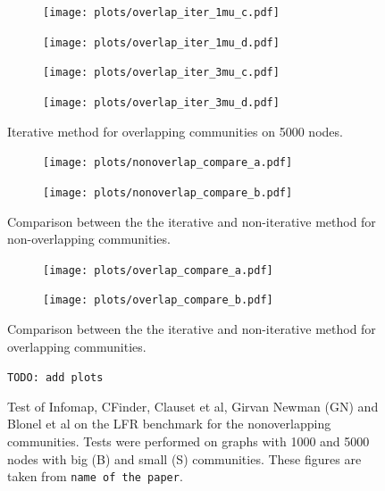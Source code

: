 \begin{figure}
    \centering
    \begin{subfigure}{0.5\textwidth}
    \centering
    \texttt{[image: plots/overlap\_iter\_1mu\_c.pdf]}
    \end{subfigure}%
    \begin{subfigure}{0.5\textwidth}
    \centering
    \texttt{[image: plots/overlap\_iter\_1mu\_d.pdf]}
    \end{subfigure}
    \begin{subfigure}{0.5\textwidth}
    \centering
    \texttt{[image: plots/overlap\_iter\_3mu\_c.pdf]}
    \end{subfigure}%
    \begin{subfigure}{0.5\textwidth}
    \centering
    \texttt{[image: plots/overlap\_iter\_3mu\_d.pdf]}
    \end{subfigure}
    \caption{Iterative method for overlapping communities on 5000 nodes.}\label{fig:iter_overlap_5000N}
\end{figure}

\begin{figure}
    \centering
    \begin{subfigure}{0.5\textwidth}
    \centering
    \texttt{[image: plots/nonoverlap\_compare\_a.pdf]}
    \end{subfigure}%
    \begin{subfigure}{0.5\textwidth}
    \centering
    \texttt{[image: plots/nonoverlap\_compare\_b.pdf]}
    \end{subfigure}
    \caption{Comparison between the the iterative and non-iterative method for non-overlapping communities.}\label{fig:compare_iter_no_overlap}
\end{figure}


\begin{figure}
    \centering
    \begin{subfigure}{0.5\textwidth}
    \centering
    \texttt{[image: plots/overlap\_compare\_a.pdf]}
    \end{subfigure}%
    \begin{subfigure}{0.5\textwidth}
    \centering
    \texttt{[image: plots/overlap\_compare\_b.pdf]}
    \end{subfigure}
    \caption{Comparison between the the iterative and non-iterative method for overlapping communities.}\label{fig:compare_iter_overlap}
\end{figure}


\begin{figure}
    \centering
    \texttt{TODO: add plots}
    \caption{
        Test of Infomap, CFinder, Clauset et al, Girvan Newman (GN) and Blonel et al on the LFR benchmark for the nonoverlapping communities. 
        Tests were performed on graphs with 1000 and 5000 nodes with big (B) and small (S) communities.
        These figures are taken from \texttt{name of the paper}.
    }
\end{figure}


